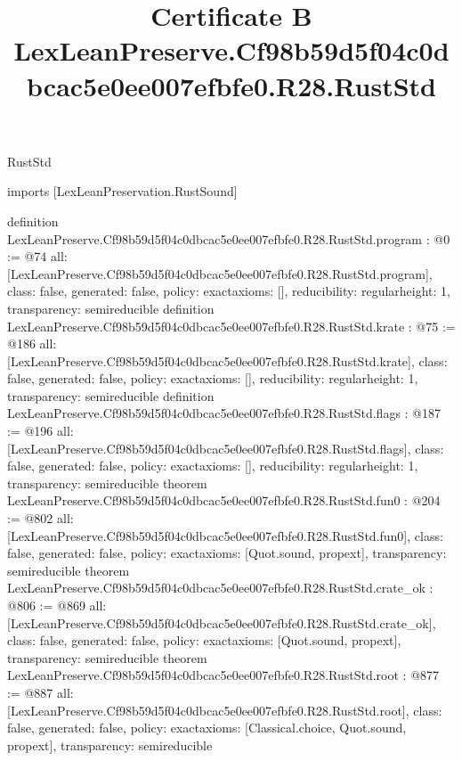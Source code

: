 \begin{lexlean}{RustStd}
\title{Certificate B LexLeanPreserve.Cf98b59d5f04c0dbcac5e0ee007efbfe0.R28.RustStd}
\begin{coremodule}
imports [LexLeanPreservation.RustSound]

definition LexLeanPreserve.Cf98b59d5f04c0dbcac5e0ee007efbfe0.R28.RustStd.program : @0 := @74 {
  all: [LexLeanPreserve.Cf98b59d5f04c0dbcac5e0ee007efbfe0.R28.RustStd.program],
  class: false,
  generated: false,
  policy: exact{axioms: []},
  reducibility: regular{height: 1},
  transparency: semireducible
}
definition LexLeanPreserve.Cf98b59d5f04c0dbcac5e0ee007efbfe0.R28.RustStd.krate : @75 := @186 {
  all: [LexLeanPreserve.Cf98b59d5f04c0dbcac5e0ee007efbfe0.R28.RustStd.krate],
  class: false,
  generated: false,
  policy: exact{axioms: []},
  reducibility: regular{height: 1},
  transparency: semireducible
}
definition LexLeanPreserve.Cf98b59d5f04c0dbcac5e0ee007efbfe0.R28.RustStd.flags : @187 := @196 {
  all: [LexLeanPreserve.Cf98b59d5f04c0dbcac5e0ee007efbfe0.R28.RustStd.flags],
  class: false,
  generated: false,
  policy: exact{axioms: []},
  reducibility: regular{height: 1},
  transparency: semireducible
}
theorem LexLeanPreserve.Cf98b59d5f04c0dbcac5e0ee007efbfe0.R28.RustStd.fun0 : @204 := @802 {
  all: [LexLeanPreserve.Cf98b59d5f04c0dbcac5e0ee007efbfe0.R28.RustStd.fun0],
  class: false,
  generated: false,
  policy: exact{axioms: [Quot.sound, propext]},
  transparency: semireducible
}
theorem LexLeanPreserve.Cf98b59d5f04c0dbcac5e0ee007efbfe0.R28.RustStd.crate_ok : @806 := @869 {
  all: [LexLeanPreserve.Cf98b59d5f04c0dbcac5e0ee007efbfe0.R28.RustStd.crate_ok],
  class: false,
  generated: false,
  policy: exact{axioms: [Quot.sound, propext]},
  transparency: semireducible
}
theorem LexLeanPreserve.Cf98b59d5f04c0dbcac5e0ee007efbfe0.R28.RustStd.root : @877 := @887 {
  all: [LexLeanPreserve.Cf98b59d5f04c0dbcac5e0ee007efbfe0.R28.RustStd.root],
  class: false,
  generated: false,
  policy: exact{axioms: [Classical.choice, Quot.sound, propext]},
  transparency: semireducible
}


\end{coremodule}
\end{lexlean}
